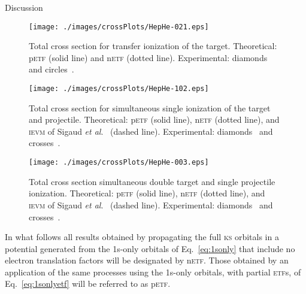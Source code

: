 \documentclass[aps, pra, reprint, groupedaddress, amsfonts, longbibliography,
               amsmath, amssymb, showpacs, nofootinbib]{revtex4-1}
\begin{document}
\begin{section}{Discussion \label{sec:disc}}
   \begin{figure}[t]
      \centering
      \texttt{[image: ./images/crossPlots/HepHe-021.eps]}
      \caption{Total cross section for transfer ionization of the target.
               Theoretical: p\textsc{etf} (solid line) and n\textsc{etf} (dotted line).
               Experimental: diamonds~\cite{Dub-89} and circles~\cite{FTFHLP-95}. \label{fig:cs021}}
   \end{figure}
   \begin{figure}[t]
      \centering
      \texttt{[image: ./images/crossPlots/HepHe-102.eps]}
      \caption{Total cross section for simultaneous single ionization of the target and projectile.
               Theoretical: p\textsc{etf} (solid line), n\textsc{etf} (dotted line), and
                            \textsc{ievm} of Sigaud \textit{et al}.~\cite{SM-03} (dashed line).
               Experimental: diamonds~\cite{Dub-89} and crosses~\cite{SSMSM-11}. \label{fig:cs102}}
   \end{figure}

   \begin{figure}[t]
      \centering
      \texttt{[image: ./images/crossPlots/HepHe-003.eps]}
      \caption{Total cross section simultaneous double target and single projectile ionization.
               Theoretical: p\textsc{etf} (solid line), n\textsc{etf} (dotted line), and
               \textsc{ievm} of Sigaud \textit{et al}.~\cite{SM-03} (dashed line).
               Experimental: diamonds~\cite{Dub-89} and crosses~\cite{SSMSM-11}. \label{fig:cs003}}
   \end{figure}

   In what follows all results obtained by propagating the full \textsc{ks} orbitals in a potential
   generated from the 1s-only orbitals of Eq.~\eqref{eq:1sonly} that include no electron translation
   factors will be designated by n\textsc{etf}. Those obtained by an application of the same processes
   using the 1s-only orbitals, with partial \textsc{etf}s, of Eq.~\eqref{eq:1sonlyetf} will be referred
   to as p\textsc{etf}.


\end{section}
\end{document}
